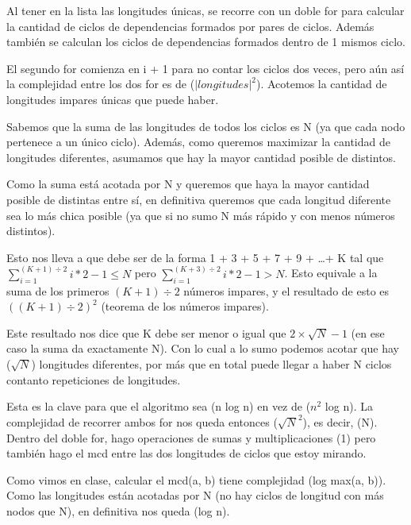 	Al tener en la lista las longitudes únicas, se recorre con un doble for para calcular la cantidad de ciclos de dependencias formados por pares de ciclos. Además también se calculan los ciclos de dependencias formados dentro de 1 mismos ciclo. \newline

	El segundo for comienza en i + 1 para no contar los ciclos dos veces, pero aún así la complejidad entre los dos for es de \bigo($|longitudes|^2$). Acotemos la cantidad de longitudes impares únicas que puede haber. \newline

	Sabemos que la suma de las longitudes de todos los ciclos es N (ya que cada nodo pertenece a un único ciclo). Además, como queremos maximizar la cantidad de longitudes diferentes, asumamos que hay la mayor cantidad posible de distintos. \newline

	Como la suma está acotada por N y queremos que haya la mayor cantidad posible de distintas entre sí, en definitiva queremos que cada longitud diferente sea lo más chica posible (ya que si no sumo N más rápido y con menos números distintos). \newline

	Esto nos lleva a que debe ser de la forma 1 + 3 + 5 + 7 + 9 + \ldots + K tal que $\sum_{i = 1}^{(K + 1) \div 2}{i * 2 - 1} \leq N $ pero $\sum_{i = 1}^{(K + 3) \div 2}{i * 2 - 1} > N $. Esto equivale a la suma de los primeros $(K + 1) \div 2$ números impares, y el resultado de esto es $((K + 1) \div 2)^2$ (teorema de los números impares). \newline

	Este resultado nos dice que K debe ser menor o igual que $2 \times \sqrt{N} - 1$ (en ese caso la suma da exactamente N). Con lo cual a lo sumo podemos acotar que hay \bigo($\sqrt{N}$) longitudes diferentes, por más que en total puede llegar a haber N ciclos contanto repeticiones de longitudes. \newline

	Esta es la clave para que el algoritmo sea \bigo(n log n) en vez de \bigo($n^2$ log n). La complejidad de recorrer ambos for nos queda entonces \bigo($\sqrt{N}^2$), es decir, \bigo(N). Dentro del doble for, hago operaciones de sumas y multiplicaciones \bigo(1) pero también hago el mcd entre las dos longitudes de ciclos que estoy mirando. \newline

	Como vimos en clase, calcular el mcd(a, b) tiene complejidad \bigo(log max(a, b)). Como las longitudes están acotadas por N (no hay ciclos de longitud con más nodos que N), en definitiva nos queda \bigo(log n). \newline

